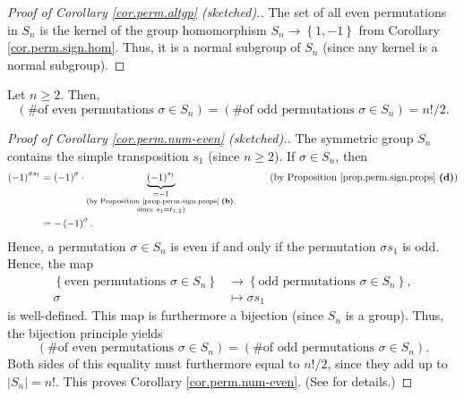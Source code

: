\begin{proof}
[Proof of Corollary \ref{cor.perm.altgp} (sketched).]The set of all even
permutations in $S_{n}$ is the kernel of the group homomorphism $S_{n}%
\rightarrow\left\{  1,-1\right\}  $ from Corollary \ref{cor.perm.sign.hom}.
Thus, it is a normal subgroup of $S_{n}$ (since any kernel is a normal subgroup).
\end{proof}

\begin{corollary}
\label{cor.perm.num-even}Let $n\geq2$. Then,%
\[
\left(  \text{\# of even permutations }\sigma\in S_{n}\right)  =\left(
\text{\# of odd permutations }\sigma\in S_{n}\right)  =n!/2.
\]

\end{corollary}

\begin{proof}
[Proof of Corollary \ref{cor.perm.num-even} (sketched).]The symmetric group
$S_{n}$ contains the simple transposition $s_{1}$ (since $n\geq2$). If
$\sigma\in S_{n}$, then
\begin{align*}
\left(  -1\right)  ^{\sigma s_{1}}  &  =\left(  -1\right)  ^{\sigma}%
\cdot\underbrace{\left(  -1\right)  ^{s_{1}}}_{\substack{=-1\\\text{(by
Proposition \ref{prop.perm.sign.props} \textbf{(b)},}\\\text{since }%
s_{1}=t_{1,2}\text{)}}}\ \ \ \ \ \ \ \ \ \ \left(  \text{by Proposition
\ref{prop.perm.sign.props} \textbf{(d)}}\right) \\
&  =-\left(  -1\right)  ^{\sigma}.
\end{align*}
Hence, a permutation $\sigma\in S_{n}$ is even if and only if the permutation
$\sigma s_{1}$ is odd. Hence, the map%
\begin{align*}
\left\{  \text{even permutations }\sigma\in S_{n}\right\}   &  \rightarrow
\left\{  \text{odd permutations }\sigma\in S_{n}\right\}  ,\\
\sigma &  \mapsto\sigma s_{1}%
\end{align*}
is well-defined. This map is furthermore a bijection (since $S_{n}$ is a
group). Thus, the bijection principle yields
\[
\left(  \text{\# of even permutations }\sigma\in S_{n}\right)  =\left(
\text{\# of odd permutations }\sigma\in S_{n}\right)  .
\]
Both sides of this equality must furthermore equal to $n!/2$, since they add
up to $\left\vert S_{n}\right\vert =n!$. This proves Corollary
\ref{cor.perm.num-even}. (See \cite[Exercise 5.4]{detnotes} for details.)
\end{proof}

